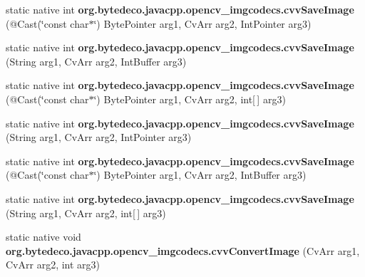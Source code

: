 \begin{DoxyCompactItemize}
\item 
\mbox{\label{group__imgcodecs__c_ga10d3b656aba495b5aa52416920924a5d}} 
static native int {\bfseries org.\+bytedeco.\+javacpp.\+opencv\+\_\+imgcodecs.\+cvv\+Save\+Image} (@Cast(\char`\"{}const char$\ast$\char`\"{}) Byte\+Pointer arg1, Cv\+Arr arg2, Int\+Pointer arg3)
\item 
\mbox{\label{group__imgcodecs__c_gaf8c306c2a0ecdf00f93429c6646e6be6}} 
static native int {\bfseries org.\+bytedeco.\+javacpp.\+opencv\+\_\+imgcodecs.\+cvv\+Save\+Image} (String arg1, Cv\+Arr arg2, Int\+Buffer arg3)
\item 
\mbox{\label{group__imgcodecs__c_ga35412b7d89f914442c693133c3df10c0}} 
static native int {\bfseries org.\+bytedeco.\+javacpp.\+opencv\+\_\+imgcodecs.\+cvv\+Save\+Image} (@Cast(\char`\"{}const char$\ast$\char`\"{}) Byte\+Pointer arg1, Cv\+Arr arg2, int\mbox{[}$\,$\mbox{]} arg3)
\item 
\mbox{\label{group__imgcodecs__c_ga877f18e07ac9fe2d3c86dc71dfc4feb0}} 
static native int {\bfseries org.\+bytedeco.\+javacpp.\+opencv\+\_\+imgcodecs.\+cvv\+Save\+Image} (String arg1, Cv\+Arr arg2, Int\+Pointer arg3)
\item 
\mbox{\label{group__imgcodecs__c_gacf714093b10bb6859f834e1652326189}} 
static native int {\bfseries org.\+bytedeco.\+javacpp.\+opencv\+\_\+imgcodecs.\+cvv\+Save\+Image} (@Cast(\char`\"{}const char$\ast$\char`\"{}) Byte\+Pointer arg1, Cv\+Arr arg2, Int\+Buffer arg3)
\item 
\mbox{\label{group__imgcodecs__c_ga5e0c23736ac5142c9a867888861b9f80}} 
static native int {\bfseries org.\+bytedeco.\+javacpp.\+opencv\+\_\+imgcodecs.\+cvv\+Save\+Image} (String arg1, Cv\+Arr arg2, int\mbox{[}$\,$\mbox{]} arg3)
\item 
\mbox{\label{group__imgcodecs__c_ga11a02fe0dece88db9d0e73fa860e8929}} 
static native void {\bfseries org.\+bytedeco.\+javacpp.\+opencv\+\_\+imgcodecs.\+cvv\+Convert\+Image} (Cv\+Arr arg1, Cv\+Arr arg2, int arg3)
\end{DoxyCompactItemize}
